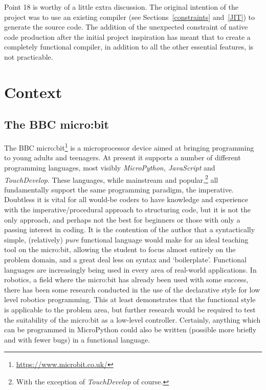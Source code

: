 \documentclass[12pt, a4paper]{report}
\begin{document}
Point 18 is worthy of a little extra discussion. The original intention of the project was to use
an existing compiler (see Sections~\ref{constraints} and~\ref{JIT}) to generate the source code.
The addition of the unexpected constraint of native code production after the initial project
inspiration has meant that to create a completely functional compiler, in addition to all the other
essential features, is not practicable.

\chapter{Context} 
\section{The BBC micro:bit} The BBC micro:bit\footnote{\url{https://www.microbit.co.uk/}} is a
microprocessor device aimed at bringing programming to young adults and teenagers. At present it
supports a number of different programming languages, most visibly \textit{MicroPython, JavaScript}
and \textit{TouchDevelop}. These languages, while mainstream and popular,\footnote{With the
exception of \textit{TouchDevelop} of course.} all fundamentally support the same programming
paradigm, the imperative. Doubtless it is vital for all would-be coders to have knowledge and
experience with the imperative/procedural approach to structuring code, but it is not the only
approach, and perhaps not the best for beginners or those with only a passing interest in coding.
It is the contention of the author that a syntactically simple, (relatively) \textit{pure}
functional language would make for an ideal teaching tool on the micro:bit, allowing the
student to focus almost entirely on the problem domain, and a great deal less on syntax and
`boilerplate'. Functional languages are increasingly being used in every area of real-world
applications. In robotics, a field where the micro:bit has already been used with some success,
there has been some research conducted in the use of the declarative style for low level robotics
programming\cite{frob}. This at least demonstrates that the functional style is applicable to the
problem area, but further research would be required to test the suitability of the micro:bit as
a low-level controller. Certainly, anything which can be programmed in MicroPython could also be
written (possible more briefly and with fewer bugs) in a functional language.
\end{document}
